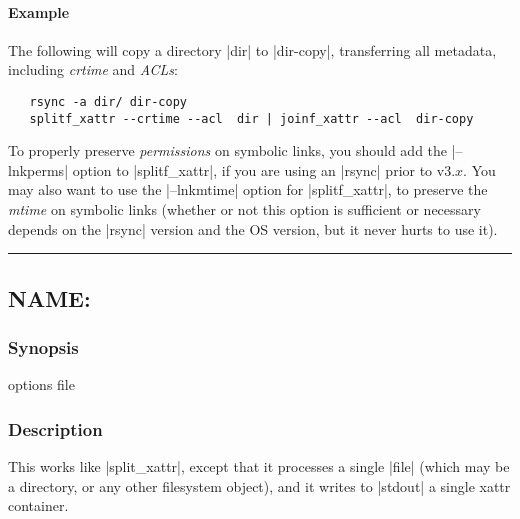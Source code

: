 \documentclass[11pt]{article}
\def\sepline{\begin{center}\rule{5in}{1pt}\end{center}}
\newcommand\BackSlash{\char92}
\newcommand\LeftBrace{\char123}
\newcommand\RightBrace{\char125}
\newenvironment{Quote}{\let\\\BackSlash\let\{\LeftBrace\let\}\RightBrace}{}
\begin{document}
\paragraph*{Example}

The following will copy a directory |dir| to |dir-copy|, transferring all
metadata, including \emph{crtime} and \emph{ACLs}:
\begin{Verbatim}
   rsync -a dir/ dir-copy
   splitf_xattr --crtime --acl  dir | joinf_xattr --acl  dir-copy
\end{Verbatim}
To properly preserve \emph{permissions} on symbolic links,
you should add the |--lnkperms| option to |splitf_xattr|,
if you are using an |rsync| prior to v3.$x$.
You may also want to use the |--lnkmtime| option for |splitf_xattr|,
to preserve the \emph{mtime} on symbolic links (whether
or not this option is sufficient or necessary depends
on the |rsync| version and the OS version, but it never hurts to
use it).
   


\sepline


\subsection*{NAME: \tt{}}

\subsubsection*{Synopsis}

\begin{Quote}
\begin{Vrb}
    options file
\end{Vrb}
\end{Quote}

\subsubsection*{Description}


This works like |split_xattr|, except that 
it processes a single |file| (which may be a directory,
or any other filesystem object),
and it writes to |stdout| a single xattr container.
\end{document}

